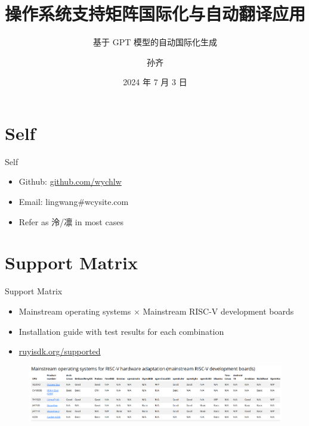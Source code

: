 \documentclass{beamer}
\title{操作系统支持矩阵国际化与自动翻译应用}
\subtitle{基于 GPT 模型的自动国际化生成}
\institute{测试小队}
\author{孙齐}
\date{2024 年 7 月 3 日}
\begin{document}
\begin{frame}
    \titlepage
\end{frame}

\begin{frame}
    \tableofcontents[sectionstyle=show,subsectionstyle=show/shaded/hide,subsubsectionstyle=show/shaded/hide]
\end{frame}

\section{Self}

\begin{frame}{Self}
    \begin{itemize}
        \item Github: \href{\#wychlw}{github.com/wychlw}
        \newline
        \item Email: lingwang\#wcysite.com
        \newline
        \item Refer as 泠/凛 in most cases
    \end{itemize}
\end{frame}

\section{Support Matrix}

\begin{frame}{Support Matrix}
    \begin{itemize}
        \item Mainstream operating systems $\times$ Mainstream RISC-V development boards
        \item Installation guide with test results for each combination
        \item \url{ruyisdk.org/supported}
    \end{itemize}
    \begin{figure}
        \centering
            \includegraphics[width=\textwidth]{pic/matrix.png}
    \end{figure}
\end{frame}
\end{document}
